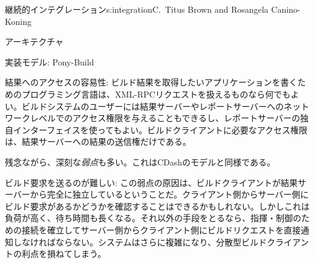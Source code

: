 \begin{aosachapter}{継続的インテグレーション}{s:integration}{C.\ Titus Brown and Rosangela Canino-Koning}
\begin{aosasect1}{アーキテクチャ}
\begin{aosasect2}{実装モデル: Pony-Build}
\begin{aosadescription}
  \item{結果へのアクセスの容易性:} ビルド結果を取得したいアプリケーションを書くためのプログラミング言語は、XML-RPCリクエストを扱えるものなら何でもよい。ビルドシステムのユーザーには結果サーバーやレポートサーバーへのネットワークレベルでのアクセス権限を与えることもできるし、レポートサーバーの独自インターフェイスを使ってもよい。ビルドクライアントに必要なアクセス権限は、結果サーバーへの結果の送信権だけである。

\end{aosadescription}

残念ながら、深刻な\emph{弱点}も多い。これはCDashのモデルと同様である。

\begin{aosadescription}

  \item{ビルド要求を送るのが難しい:} この弱点の原因は、ビルドクライアントが結果サーバーから完全に独立しているということだ。クライアント側からサーバー側にビルド要求があるかどうかを確認することはできるかもしれない。しかしこれは負荷が高く、待ち時間も長くなる。それ以外の手段をとるなら、指揮・制御のための接続を確立してサーバー側からクライアント側にビルドリクエストを直接通知しなければならない。システムはさらに複雑になり、分散型ビルドクライアントの利点を損ねてしまう。


\end{aosadescription}
\end{aosasect2}
\end{aosasect1}
\end{aosachapter}
